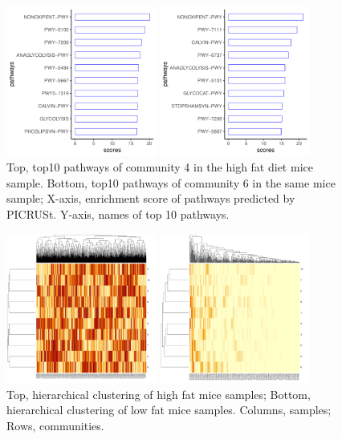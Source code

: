 \documentclass{bioinfo}
\begin{document}
\begin{figure}[!tpb]%
	\centerline{\includegraphics[width=140pt,height=140pt,keepaspectratio]{fig_3_a.pdf}}
	\centerline{\includegraphics[width=140pt,height=140pt,keepaspectratio]{fig_3_b.pdf}}
	\caption{Top, top10 pathways of community 4 in the high fat diet mice sample. Bottom, top10 pathways of community 6 in the same mice sample; X-axis, enrichment score of pathways predicted by PICRUSt. Y-axis, names of top 10 pathways.}\label{fig:03}
\end{figure}

\begin{figure}[!tpb]%
	\centerline{\includegraphics[width=140pt,height=140pt,keepaspectratio]{fig_4_a.pdf}}
	\centerline{\includegraphics[width=140pt,height=140pt,keepaspectratio]{fig_4_b.pdf}}
	\caption{Top, hierarchical clustering of high fat mice samples; Bottom, hierarchical clustering of low fat mice samples. Columns, samples; Rows, communities.}\label{fig:04}
\end{figure}
\end{document}
